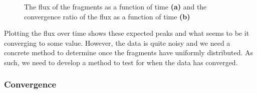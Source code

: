 \documentclass{article}
\begin{document}
\begin{figure}[t]
	\begin{adjustbox}{max width=1.6\linewidth,center}
		\centering     %
	\end{adjustbox}
	\caption{The flux of the fragments as a function of time \textbf{(a)} and the convergence ratio of the flux as a function of time \textbf{(b)} }
\end{figure}

Plotting the flux over time shows these expected peaks and what seems to be it converging to some value. However, the data is quite noisy and we need a concrete method to determine once the fragments have uniformly distributed. As such, we need to develop a method to test for when the data has converged.

 \subsubsection{Convergence}
 
\end{document}
